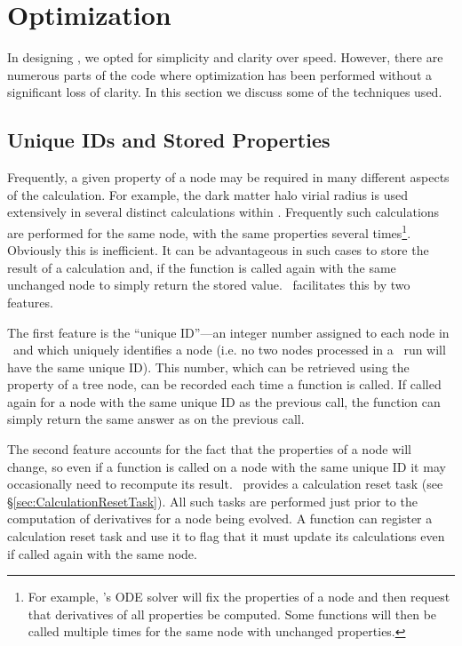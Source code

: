 \section{Optimization}\label{sec:Optimization}

In designing \glc, we opted for simplicity and clarity over speed. However, there are numerous parts of the code where optimization has been performed without a significant loss of clarity. In this section we discuss some of the techniques used.

\subsection{Unique IDs and Stored Properties}

Frequently, a given property of a node may be required in many different aspects of the calculation. For example, the dark matter halo virial radius is used extensively in several distinct calculations within \glc. Frequently such calculations are performed for the same node, with the same properties several times\footnote{For example, \glc's ODE solver will fix the properties of a node and then request that derivatives of all properties be computed. Some functions will then be called multiple times for the same node with unchanged properties.}. Obviously this is inefficient. It can be advantageous in such cases to store the result of a calculation and, if the function is called again with the same unchanged node to simply return the stored value. \glc\ facilitates this by two features.

The first feature is the ``unique ID''---an integer number assigned to each node in \glc\ and which uniquely identifies a node (i.e. no two nodes processed in a \glc\ run will have the same unique ID). This number, which can be retrieved using the  property of a tree node, can be recorded each time a function is called. If called again for a node with the same unique ID as the previous call, the function can simply return the same answer as on the previous call.

The second feature accounts for the fact that the properties of a node will change, so even if a function is called on a node with the same unique ID it may occasionally need to recompute its result. \glc\ provides a calculation reset task (see \S\ref{sec:CalculationResetTask}). All such tasks are performed just prior to the computation of derivatives for a node being evolved. A function can register a calculation reset task and use it to flag that it must update its calculations even if called again with the same node.

